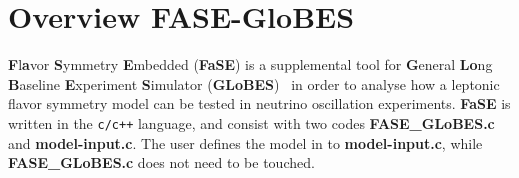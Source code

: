 \documentclass[aps,prd,nofootinbib,preprint]{revtex4}
\begin{document}


\section{Overview FASE-GloBES}

\textbf{F}l\textbf{a}vor \textbf{S}ymmetry \textbf{E}mbedded (\textbf{FaSE}) is a supplemental tool for \textbf{G}eneral \textbf{Lo}ng \textbf{B}aseline \textbf{E}xperiment \textbf{S}imulator (\textbf{GLoBES})~\cite{Huber:2004ka,Huber:2007ji} in order to analyse how a leptonic flavor symmetry model can be tested in neutrino oscillation experiments. \textbf{FaSE} is written in the \texttt{c/c++} language, and consist with two codes \textbf{FASE\_GLoBES.c} and \textbf{model-input.c}. The user defines the model in to \textbf{model-input.c}, while \textbf{FASE\_GLoBES.c} does not need to be touched. 
\end{document}
